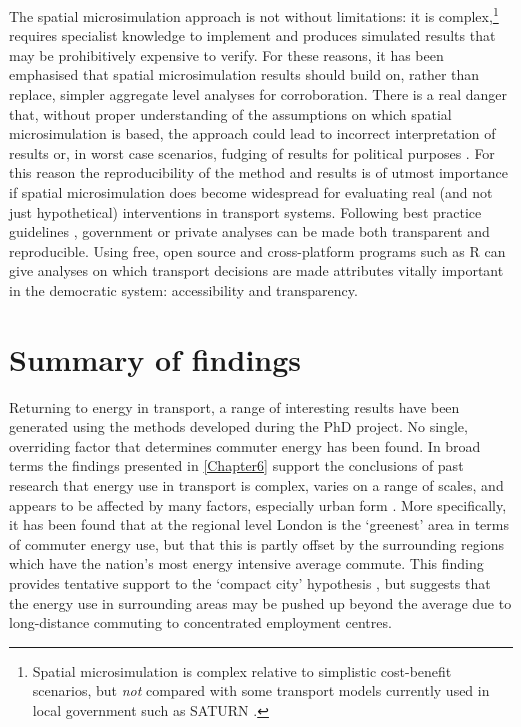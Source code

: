 \documentclass[a4paper, 11pt, twoside]{Thesis}
\begin{document}
The spatial microsimulation approach is not without limitations:
it is complex,\footnote{Spatial
microsimulation is complex relative to
simplistic cost-benefit scenarios, but \emph{not}
compared with some transport models currently used in local government such as
SATURN \citep{SATURN2012}.
}
requires specialist knowledge to implement and produces simulated results that
may be prohibitively expensive to verify. For these reasons, it has been
emphasised that spatial microsimulation results should build on, rather than
replace, simpler aggregate level analyses for corroboration. There is a real
danger that, without proper understanding of the assumptions on which spatial
microsimulation is based, the approach could lead to incorrect interpretation
of results or, in worst case scenarios, fudging of results for political
purposes \citep{Openshaw1978}.
For this reason the reproducibility of the method and results is of utmost
importance if spatial microsimulation does
become widespread for evaluating real (and not just hypothetical)
interventions in transport systems. Following best practice guidelines
\citep{Peng2006}, government or private analyses can be made both transparent
and reproducible. Using free, open source and cross-platform programs such as R
can give analyses on which transport decisions are made attributes
vitally important in the democratic system: accessibility and transparency.

\section{Summary of findings} \label{sumfind}
Returning to energy in transport, a range of interesting results have been
generated using the methods developed during the PhD project.
No single,
overriding factor that determines commuter energy has been found. In broad
terms the findings presented in \cref{Chapter6}
support the conclusions of past research that energy use in transport is
complex, varies on a range of scales, and appears to be affected by many
factors, especially urban form \citep{Levtnson1997, smith2011polycentricity,
Levinson2012}.
More specifically, it has been found that at the regional level London
is the `greenest' area in terms of commuter energy use, but that this is
partly offset by the surrounding regions which have the nation's most
energy intensive average commute. This finding provides tentative support
to the `compact city' hypothesis \citep{Breheny1995}, but suggests that
the energy use in surrounding areas may be pushed up beyond the average
due to long-distance commuting to concentrated employment centres.
\end{document}
